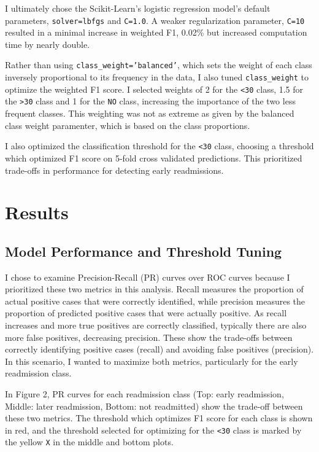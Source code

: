 \documentclass{article}      %
\begin{document}
I ultimately chose the Scikit-Learn's logistic regression model's default parameters, \texttt{solver=lbfgs} and \texttt{C=1.0}. A weaker regularization parameter, \texttt{C=10} resulted in a minimal increase in weighted F1, 0.02\% but increased computation time by nearly double.

Rather than using \texttt{class\_weight='balanced'}, which sets the weight of each class inversely proportional to its frequency in the data, I also tuned \texttt{class\_weight} to optimize the weighted F1 score. I selected weights of 2 for the \texttt{\textless 30} class, 1.5 for the \texttt{\textgreater 30} class and 1 for the \texttt{NO} class, increasing the importance of the two less frequent classes. This weighting was not as extreme as given by the balanced class weight paramenter, which is based on the class proportions.

I also optimized the classification threshold for the \texttt{\textless 30} class, choosing a threshold which optimized F1 score on 5-fold cross validated predictions. This prioritized trade-offs in performance for detecting early readmissions.

\section{Results}

\subsection{Model Performance and Threshold Tuning}

I chose to examine Precision-Recall (PR) curves over ROC curves because I prioritized these two metrics in this analysis. Recall measures the proportion of actual positive cases that were correctly identified, while precision measures the proportion of predicted positive cases that were actually positive. As recall increases and more true positives are correctly classified, typically there are also more false positives, decreasing precision. These show the trade-offs between correctly identifying positive cases (recall) and avoiding false positives (precision). In this scenario, I wanted to maximize both metrics, particularly for the early readmission class.

In Figure 2, PR curves for each readmission class (Top: early readmission, Middle: later readmission, Bottom: not readmitted) show the trade-off between these two metrics. The threshold which optimizes F1 score for each class is shown in red, and the threshold selected for optimizing for the \texttt{\textless 30} class is marked by the yellow \texttt{X} in the middle and bottom plots.
\end{document}

